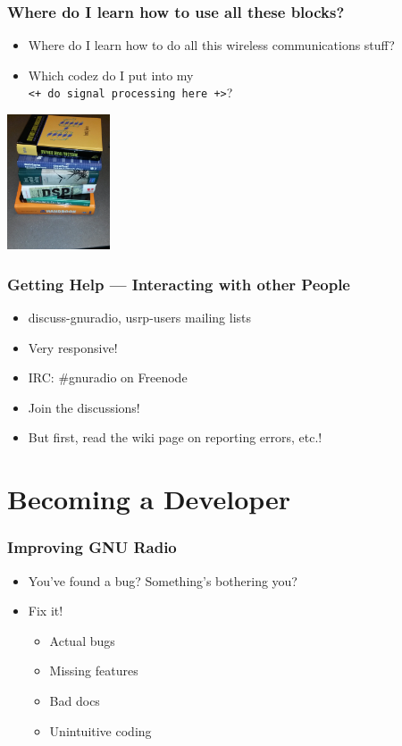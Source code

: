 \documentclass{beamer}
\begin{document}
\begin{frame}
  \frametitle{Where do I learn how to use all these blocks?}
  \begin{itemize}
    \item Where do I learn how to do all this wireless communications stuff?
    \item Which codez do I put into my \\ \texttt{<+ do signal processing here +>}?
  \end{itemize}
  \begin{center}
    \includegraphics[height=4cm]{books.jpg}
  \end{center}
\end{frame}

\begin{frame}
  \frametitle{Getting Help --- Interacting with other People}
  \begin{itemize}
    \item discuss-gnuradio, usrp-users mailing lists
    \item Very responsive!
    \item IRC\@: \#gnuradio on Freenode
    \item Join the discussions!
    \item But first, read the wiki page on reporting errors, etc.!
  \end{itemize}
\end{frame}

\section{Becoming a Developer}
\begin{frame}
  \frametitle{Improving GNU Radio}
  \begin{itemize}
    \item You've found a bug? Something's bothering you?
    \item Fix it!
      \begin{itemize}
        \item Actual bugs
        \item Missing features
        \item Bad docs
        \item Unintuitive coding
      \end{itemize}
  \end{itemize}
\end{frame}
\end{document}
